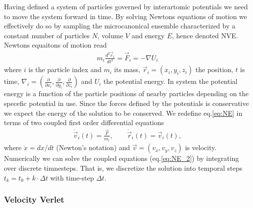 Having defined a system of particles governed by interartomic potentials we need to move the system forward in time. By solving Newtons equations of motion we effectively do so by sampling the microcanonical ensemble characterized by a constant number of particles $N$, volume $V$ and energy $E$, hence denoted NVE.  Newtons equaitons of motion read
\begin{align}
  m_i \frac{d^2 \vec{r}_i}{dt^2} = \vec{F}_i = -\nabla U_i
  \label{eq:NE}
\end{align}
where $i$ is the particle index and $m_i$ its mass, $\vec{r}_i = (x_i, y_i, z_i)$ the position, $t$ is time,  $\nabla_i = (\frac{\partial}{\partial x_i}, \frac{\partial}{\partial y_i}, \frac{\partial}{\partial z_i})$ and $U_i$ the potential energy. In system the potential energy is a function of the particle positions of nearby particles depending on the specefic potential in use. Since the forces defined by the potentials is conservative we expect the energy of the solution to be conserved. We redefine eq.\eqref{eq:NE} in terms of two coupled first order differential equations 
\begin{align}
  \dot{\vec{v}}_i(t) = \frac{\vec{F}}{m_i}, \qquad \dot{\vec{r}}_i(t) = \vec{v}_i(t),
  \label{eq:NE_2}
\end{align}
where $\dot{x} = dx/dt$ (Newton's notation) and $\vec{v} = (v_x, v_y, v_z)$ is velocity. Numerically we can solve the coupled equations (eq.\eqref{eq:NE_2}) by integrating over discrete timnesteps. That is, we discretize the solution into temporal steps $t_k = t_0 + k\cdot \Delta t$ with time-step $\Delta t$. 






\subsubsection{Velocity Verlet}

